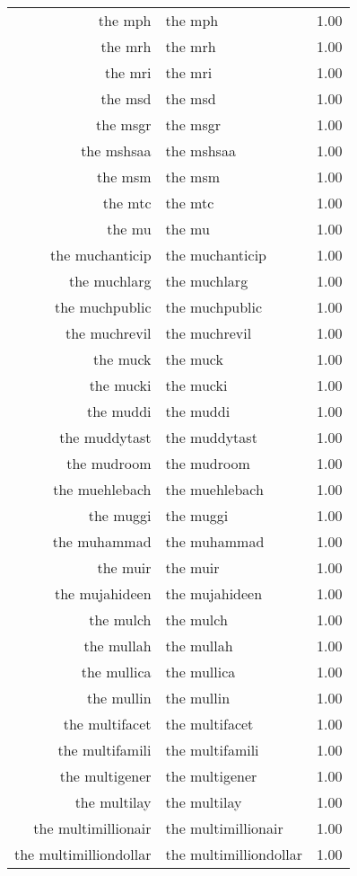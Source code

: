 \begin{table}[ht]
\begin{tabular}{rlr}
  the mph & the mph & 1.00 \\ 
  the mrh & the mrh & 1.00 \\ 
  the mri & the mri & 1.00 \\ 
  the msd & the msd & 1.00 \\ 
  the msgr & the msgr & 1.00 \\ 
  the mshsaa & the mshsaa & 1.00 \\ 
  the msm & the msm & 1.00 \\ 
  the mtc & the mtc & 1.00 \\ 
  the mu & the mu & 1.00 \\ 
  the muchanticip & the muchanticip & 1.00 \\ 
  the muchlarg & the muchlarg & 1.00 \\ 
  the muchpublic & the muchpublic & 1.00 \\ 
  the muchrevil & the muchrevil & 1.00 \\ 
  the muck & the muck & 1.00 \\ 
  the mucki & the mucki & 1.00 \\ 
  the muddi & the muddi & 1.00 \\ 
  the muddytast & the muddytast & 1.00 \\ 
  the mudroom & the mudroom & 1.00 \\ 
  the muehlebach & the muehlebach & 1.00 \\ 
  the muggi & the muggi & 1.00 \\ 
  the muhammad & the muhammad & 1.00 \\ 
  the muir & the muir & 1.00 \\ 
  the mujahideen & the mujahideen & 1.00 \\ 
  the mulch & the mulch & 1.00 \\ 
  the mullah & the mullah & 1.00 \\ 
  the mullica & the mullica & 1.00 \\ 
  the mullin & the mullin & 1.00 \\ 
  the multifacet & the multifacet & 1.00 \\ 
  the multifamili & the multifamili & 1.00 \\ 
  the multigener & the multigener & 1.00 \\ 
  the multilay & the multilay & 1.00 \\ 
  the multimillionair & the multimillionair & 1.00 \\ 
  the multimilliondollar & the multimilliondollar & 1.00 \\ 

\end{tabular}
\end{table}
